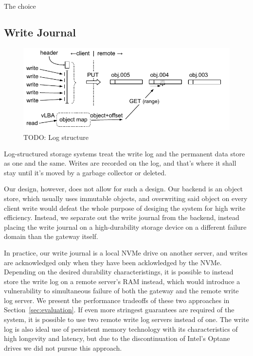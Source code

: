 The choice 

\subsection{Write Journal}

\begin{figure}
	\centering
	\includegraphics[width=1\linewidth]{figs/arch-translation.pdf}
	\caption[short]{TODO: Log structure}
\end{figure}

Log-structured storage systems treat the write log and the permanent data store
as one and the same. Writes are recorded on the log, and that's where it shall
stay until it's moved by a garbage collector or deleted.

Our design, however, does not allow for such a design. Our backend is an object
store, which usually uses immutable objects, and overwriting said object on
every client write would defeat the whole purpose of desiging the system for
high write efficiency. Instead, we separate out the write journal from the
backend, instead placing the write journal on a high-durability storage device
on a different failure domain than the gateway itself.

In practice, our write journal is a local NVMe drive on another server, and
writes are acknowledged only when they have been acklowledged by the NVMe.
Depending on the desired durability characteristings, it is possible to instead
store the write log on a remote server's RAM instead, which would introduce a
vulnerability to simultaneous failure of both the gateway and the remote write
log server. We present the performance tradeoffs of these two approaches in
Section~\ref{sec:evaluation}. If even more stringest guarantees are required of
the system, it is possible to use two remote write log servers instead of one.
 The write log is also ideal use of persistent memory
technology with its characteristics of high longevity and latency, but due to
the discontinuation of Intel's Optane drives we did not pursue this approach.

